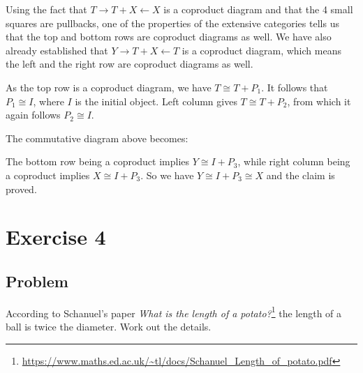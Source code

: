 \documentclass{article}
\begin{document}
\begin{center}\end{center}


Using the fact that $T \rightarrow T+X \leftarrow X$ is a coproduct diagram and that the 4 small squares are pullbacks, one of the properties of the extensive categories tells us that the top and bottom rows are coproduct diagrams as well. We have also already established that $Y \rightarrow T+X \leftarrow T$ is a coproduct diagram, which means the left and the right row are coproduct diagrams as well.

As the top row is a coproduct diagram, we have $T \cong T+P_1$. It follows that $P_1 \cong I$, where $I$ is the initial object.
Left column gives $T \cong T + P_2$, from which it again follows $P_2 \cong I$.

The commutative diagram above becomes:


\begin{center}\end{center}


The bottom row being a coproduct implies $Y \cong I + P_3$, while right column being a coproduct implies $X \cong I + P_3$.
So we have $Y \cong I+P_3 \cong X$ and the claim is proved.
\newpage
\section*{Exercise 4}
\subsection*{Problem}
According to Schanuel's paper \textit{What is the length of a potato?}\footnote{\url{https://www.maths.ed.ac.uk/~tl/docs/Schanuel_Length_of_potato.pdf}} the length of a ball is twice the diameter. Work out the details.
\end{document}
